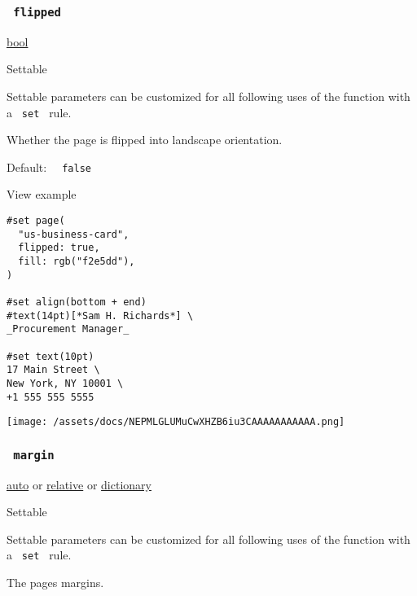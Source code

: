 \subsubsection{\texorpdfstring{\texttt{\ flipped\ }}{ flipped }}\label{parameters-flipped}

\href{/docs/reference/foundations/bool/}{bool}

{{ Settable }}

\label{parameters-flipped-settable-tooltip}
Settable parameters can be customized for all following uses of the
function with a \texttt{\ set\ } rule.

Whether the page is flipped into landscape orientation.

Default: \texttt{\ }{\texttt{\ false\ }}\texttt{\ }


View example

\begin{verbatim}
#set page(
  "us-business-card",
  flipped: true,
  fill: rgb("f2e5dd"),
)

#set align(bottom + end)
#text(14pt)[*Sam H. Richards*] \
_Procurement Manager_

#set text(10pt)
17 Main Street \
New York, NY 10001 \
+1 555 555 5555
\end{verbatim}

\texttt{[image: /assets/docs/NEPMLGLUMuCwXHZB6iu3CAAAAAAAAAAA.png]}

\subsubsection{\texorpdfstring{\texttt{\ margin\ }}{ margin }}\label{parameters-margin}

\href{/docs/reference/foundations/auto/}{auto} {or}
\href{/docs/reference/layout/relative/}{relative} {or}
\href{/docs/reference/foundations/dictionary/}{dictionary}

{{ Settable }}

\label{parameters-margin-settable-tooltip}
Settable parameters can be customized for all following uses of the
function with a \texttt{\ set\ } rule.

The page\textquotesingle s margins.

